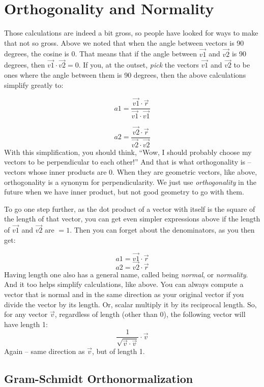 \documentclass[
]{book}
\begin{document}
\hypertarget{orthogonality-and-normality-1}{%
\section{Orthogonality and Normality}\label{orthogonality-and-normality-1}}

Those calculations are indeed a bit gross, so people have looked for ways to make that not so gross. Above we noted that when the angle between vectors is 90 degrees, the cosine is 0. That means that if the angle between \(\vec{v1}\) and \(\vec{v2}\) is 90 degrees, then \(\vec{v1}\cdot\vec{v2} = 0\). If you, at the outset, \emph{pick} the vectors \(\vec{v1}\) and \(\vec{v2}\) to be ones where the angle between them is 90 degrees, then the above calculations simplify greatly to:

\[a1 = \frac{\vec{v1}\cdot\vec{r}}{\vec{v1}\cdot\vec{v1}}\]

\[a2 = \frac{\vec{v2}\cdot\vec{r}}{\vec{v2}\cdot\vec{v2}}\]
With this simplification, you should think, ``Wow, I should probably choose my vectors to be perpendicular to each other!'' And that is what orthogonality is -- vectors whose inner products are 0. When they are geometric vectors, like above, orthogonality is a synonym for perpendicularity. We just use \emph{orthogonality} in the future when we have inner product, but not good geometry to go with them.

To go one step further, as the dot product of a vector with itself is the square of the length of that vector, you can get even simpler expressions above if the length of \(\vec{v1}\) and \(\vec{v2}\) are \(= 1\). Then you can forget about the denominators, as you then get:

\[a1 = \vec{v1}\cdot\vec{r}\]
\[a2 = \vec{v2}\cdot\vec{r}\]
Having length one also has a general name, called being \emph{normal}, or \emph{normality}. And it too helps simplify calculations, like above. You can always compute a vector that is normal and in the same direction as your original vector if you divide the vector by its length. Or, scalar multiply it by its reciprocal length. So, for any vector \(\vec{v}\), regardless of length (other than 0), the following vector will have length 1:
\[\frac{1}{\sqrt{\vec{v}\cdot\vec{v}}}\cdot\vec{v}\]
Again -- same direction as \(\vec{v}\), but of length 1.

\hypertarget{gram-schmidt-orthonormalization-1}{%
\subsection{Gram-Schmidt Orthonormalization}\label{gram-schmidt-orthonormalization-1}}
\end{document}
